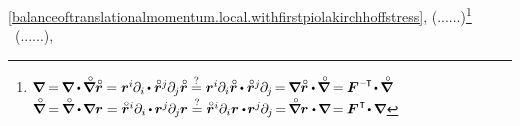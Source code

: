  \eqref{balanceoftranslationalmomentum.local.withfirstpiolakirchhoffstress}, (......)\footnote{%
${\boldnabla \hspace{-0.08ex}
= \hspace{-0.2ex} \boldnabla \dotp \hspace{-0.15ex} \boldnablacircled \initiallocationvector \hspace{-0.08ex}
= \currentlocationvector^{i} \hspace{-0.1ex} \partial_{i} \hspace{-0.15ex} \dotp \initiallocationvector^j \hspace{-0.1ex} \partial_{\hspace{-0.1ex}j} \initiallocationvector \hspace{-0.1ex}
\stackrel{?}{=} \currentlocationvector^{i} \hspace{-0.1ex} \partial_{i} \initiallocationvector \hspace{-0.1ex} \dotp \initiallocationvector^j \hspace{-0.1ex} \partial_{\hspace{-0.1ex}j} \hspace{-0.3ex}
= \hspace{-0.2ex} \boldnabla \initiallocationvector \dotp \hspace{-0.15ex} \boldnablacircled \hspace{-0.1ex}
= \hspace{-0.1ex} \bm{F}^{\hspace{.1ex}\expminusT} \hspace{-0.3ex} \dotp \hspace{-0.1ex} \boldnablacircled}$ \\
%
${\boldnablacircled \hspace{-0.1ex}
= \hspace{-0.2ex} \boldnablacircled \dotp \hspace{-0.2ex} \boldnabla \currentlocationvector
= \initiallocationvector^{i} \partial_{i} \hspace{-0.15ex} \dotp \hspace{-0.1ex} \currentlocationvector^{j} \hspace{-0.1ex} \partial_{\hspace{-0.1ex}j} \hspace{-0.1ex} \currentlocationvector
\stackrel{?}{=} \initiallocationvector^{i} \partial_{i} \currentlocationvector \dotp \hspace{-0.25ex} \currentlocationvector^{j} \hspace{-0.1ex} \partial_{\hspace{-0.1ex}j} \hspace{-0.3ex}
= \hspace{-0.3ex} \boldnablacircled \currentlocationvector \hspace{.1ex} \dotp \hspace{-0.15ex} \boldnabla \hspace{-0.25ex}
= \hspace{-0.1ex} \bm{F}^{\hspace{.1ex}\T} \hspace{-0.3ex} \dotp \hspace{-0.1ex} \boldnabla}$} ~(......), 

